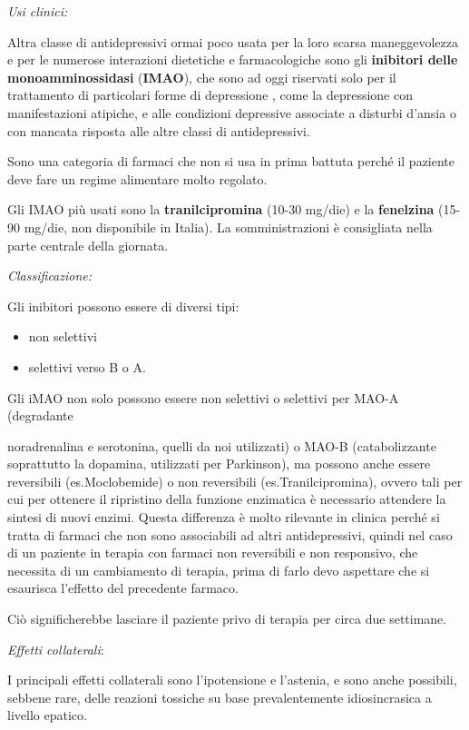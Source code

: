 \begin{itemize}
\begin{itemize}
\emph{\emph{Usi clinici:}}

Altra classe di antidepressivi ormai poco usata per la loro scarsa
maneggevolezza e per le numerose interazioni dietetiche e farmacologiche
sono gli \textbf{inibitori delle monoamminossidasi} (\textbf{IMAO}), che
sono ad oggi riservati solo per il trattamento di particolari forme di
depressione , come la depressione con manifestazioni atipiche, e alle
condizioni depressive associate a disturbi d'ansia o con mancata
risposta alle altre classi di antidepressivi.

Sono una categoria di farmaci che non si usa in prima battuta perché il
paziente deve fare un regime alimentare molto regolato.

Gli IMAO più usati sono la \textbf{tranilcipromina} (10-30 mg/die) e la
\textbf{fenelzina} (15-90 mg/die, non disponibile in Italia). La
somministrazioni è consigliata nella parte centrale della giornata.

\emph{\emph{Classificazione:}}

Gli inibitori possono essere di diversi tipi:

\begin{itemize}
\item
  non selettivi
\item
  selettivi verso B o A.
\end{itemize}

Gli iMAO non solo possono essere non selettivi o selettivi per MAO-A
(degradante

noradrenalina e serotonina, quelli da noi utilizzati) o MAO-B
(catabolizzante soprattutto la dopamina, utilizzati per Parkinson), ma
possono anche essere reversibili (es.Moclobemide) o non reversibili
(es.Tranilcipromina), ovvero tali per cui per ottenere il ripristino
della funzione enzimatica è necessario attendere la sintesi di nuovi
enzimi. Questa differenza è molto rilevante in clinica perché si tratta
di farmaci che non sono associabili ad altri antidepressivi, quindi nel
caso di un paziente in terapia con farmaci non reversibili e non
responsivo, che necessita di un cambiamento di terapia, prima di farlo
devo aspettare che si esaurisca l'effetto del precedente farmaco.

Ciò significherebbe lasciare il paziente privo di terapia per circa due
settimane.

\emph{\emph{Effetti collaterali}}:

I principali effetti collaterali sono l'ipotensione e l'astenia, e sono
anche possibili, sebbene rare, delle reazioni tossiche su base
prevalentemente idiosincrasica a livello epatico.


\end{itemize}
\end{itemize}
